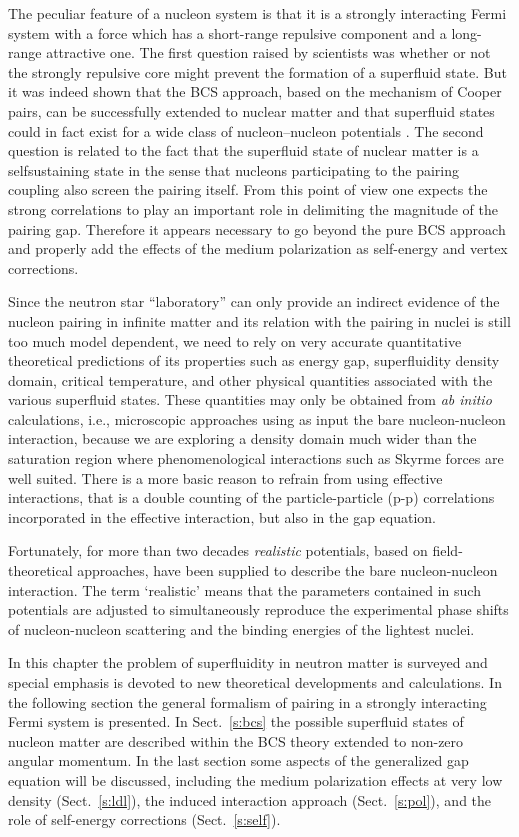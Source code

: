 \documentclass[runningheads]{svmult}
\begin{document}
The peculiar feature of a nucleon system is that it is a strongly interacting
Fermi system with a force which has a short-range repulsive component and a 
long-range attractive one.  
The first question raised by scientists was 
whether or not the strongly repulsive core might prevent the formation of a 
superfluid state. 
But it was indeed shown \cite{CMS} that the BCS approach, based on the 
mechanism of Cooper pairs, can be successfully extended to nuclear matter 
and that superfluid states could in fact exist for a wide class of 
nucleon--nucleon potentials \cite{ES}. 
The second question is related to the fact that the superfluid state of 
nuclear matter is a selfsustaining state in the sense that nucleons 
participating to the pairing coupling also screen the pairing itself.
From this point of view one expects the strong correlations to play an
important role in delimiting the magnitude of the pairing gap.    
Therefore it appears necessary to go beyond the pure BCS approach and 
properly add the effects of the medium polarization as self-energy and 
vertex corrections.

Since the neutron star ``laboratory'' can only provide an indirect evidence of 
the nucleon pairing in infinite matter and its relation with the pairing in 
nuclei is still too much model dependent, we need to rely on very accurate 
quantitative theoretical predictions of its properties such as energy gap, 
superfluidity density domain, critical temperature, and other physical 
quantities associated with the various superfluid states. 
These quantities may only be obtained from {\em ab initio}
calculations, i.e., microscopic approaches using as input the bare 
nucleon-nucleon interaction, because we are exploring a density domain much
wider than the saturation region where phenomenological interactions such as 
Skyrme forces are well suited. 
There is a more basic reason to refrain from
using effective interactions, that is a double counting of the
particle-particle (p-p) correlations incorporated in the effective
interaction, but also in the gap equation.

Fortunately, for more than two decades {\em realistic} potentials, 
based on field-theoretical approaches, 
have been supplied to describe the bare nucleon-nucleon interaction. 
The term `realistic' means that 
the parameters contained in such potentials are adjusted to simultaneously 
reproduce the experimental phase shifts of nucleon-nucleon scattering and 
the binding energies of the lightest nuclei. 

In this chapter the problem of superfluidity in neutron matter is surveyed 
and special emphasis is devoted to new theoretical developments and 
calculations. 
In the following section the general formalism of pairing in 
a strongly interacting Fermi system is presented. 
In Sect.~\ref{s:bcs} the possible superfluid states of nucleon matter are 
described within the BCS theory extended to non-zero angular momentum.  
In the last section some aspects of the generalized gap equation will
be discussed, including the medium polarization effects at very low density
(Sect.~\ref{s:ldl}), the induced interaction approach (Sect.~\ref{s:pol}),
and the role of self-energy corrections (Sect.~\ref{s:self}).
\end{document}
